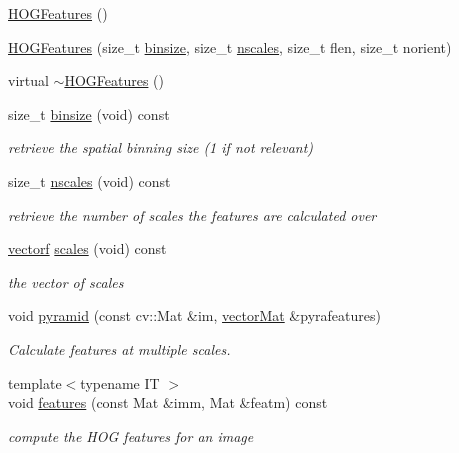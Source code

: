 \begin{DoxyCompactItemize}
\item 
\hyperlink{classHOGFeatures_a323944dc2065bfb4d7b83bac6ea0ba69}{H\+O\+G\+Features} ()
\item 
\hyperlink{classHOGFeatures_aac660f7db27da50fc026e6e25b374b5a}{H\+O\+G\+Features} (size\+\_\+t \hyperlink{classHOGFeatures_a0b75015646ceac02ba250e5af86245d4}{binsize}, size\+\_\+t \hyperlink{classHOGFeatures_a2ea95a95f6d79af3344502b45e1cb7c5}{nscales}, size\+\_\+t flen, size\+\_\+t norient)
\item 
virtual \hyperlink{classHOGFeatures_a062d1cfbb82dbd2829e844a937490509}{$\sim$\+H\+O\+G\+Features} ()
\item 
size\+\_\+t \hyperlink{classHOGFeatures_a0b75015646ceac02ba250e5af86245d4}{binsize} (void) const 
\begin{DoxyCompactList}\small\item\em retrieve the spatial binning size (1 if not relevant) \end{DoxyCompactList}\item 
size\+\_\+t \hyperlink{classHOGFeatures_a2ea95a95f6d79af3344502b45e1cb7c5}{nscales} (void) const 
\begin{DoxyCompactList}\small\item\em retrieve the number of scales the features are calculated over \end{DoxyCompactList}\item 
\hyperlink{types_8hpp_a4da5db3ee9e284f719ef5764dbadffc8}{vectorf} \hyperlink{classHOGFeatures_ad9668fda860881c676e1d1bd70adc18c}{scales} (void) const 
\begin{DoxyCompactList}\small\item\em the vector of scales \end{DoxyCompactList}\item 
void \hyperlink{classHOGFeatures_a509372c4e652c3fc97f2d2be75fecd4d}{pyramid} (const cv\+::\+Mat \&im, \hyperlink{types_8hpp_a3207a7addcfa415d1c83622febcb1e9b}{vector\+Mat} \&pyrafeatures)
\begin{DoxyCompactList}\small\item\em Calculate features at multiple scales. \end{DoxyCompactList}\item 
{\footnotesize template$<$typename I\+T $>$ }\\void \hyperlink{classHOGFeatures_a0cabf74792b44e23e3dfd2c388b12036}{features} (const Mat \&imm, Mat \&featm) const 
\begin{DoxyCompactList}\small\item\em compute the H\+O\+G features for an image \end{DoxyCompactList}\end{DoxyCompactItemize}
